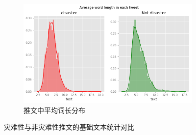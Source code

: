 \begin{figure}[htbp]
\begin{subfigure}[b]{0.48\textwidth}
        \centering
        \includegraphics[width=\textwidth]{figures/LSTM4.png}
        \caption{推文中平均词长分布}
        \label{fig:avg_word_len}
    \end{subfigure}
    \caption{灾难性与非灾难性推文的基础文本统计对比}
    \label{fig:lstm_eda_basic}
\end{figure}

